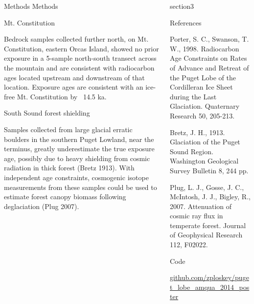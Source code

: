 \documentclass{beamer}
\begin{document}
\begin{frame}{}
\begin{columns}[T]
\begin{column}{.32\columnwidth}
\begin{block}{Methods}
Methods
	
\end{block}

	
\begin{block}{Mt. Constitution}
	
Bedrock samples collected further north, on Mt. Constitution, eastern Orcas Island, showed no prior exposure in a 5-sample north-south transect across the mountain and are consistent with radiocarbon ages located upstream and downstream of that location.
Exposure ages are consistent with an ice-free Mt. Constitution by ~14.5 ka. 

\end{block}

\begin{block}{South Sound forest shielding}

Samples collected from large glacial erratic boulders in the southern Puget Lowland, near the terminus, greatly underestimate the true exposure age, possibly due to heavy shielding from cosmic radiation in thick forest (Bretz 1913).
With independent age constraints, cosmogenic isotope measurements from these samples could be used to estimate forest canopy biomass following deglaciation (Plug 2007).

\end{block}


\end{column}

\begin{column}{.32\columnwidth}



\begin{block}{section3}
		
\end{block}


\begin{block}{References} 
{\small
	Porter, S. C., Swanson, T. W., 1998. Radiocarbon Age Constraints on Rates of Advance and Retreat of the Puget Lobe of the Cordilleran Ice Sheet during the Last Glaciation. Quaternary Research 50, 205-213.

Bretz, J. H., 1913. Glaciation of the Puget Sound Region. Washington Geological Survey Bulletin 8, 244 pp.

Plug, L. J., Gosse, J. C., McIntosh, J. J., Bigley, R., 2007. Attenuation of cosmic ray flux in temperate forest. Journal of Geophysical Research 112, F02022.
	}
\end{block}

\begin{block}{Code}
	
	\center \url{github.com/zploskey/puget_lobe_amqua_2014_poster} 
	
\end{block}

\end{column}
\end{columns}

\end{frame}
\end{document}
